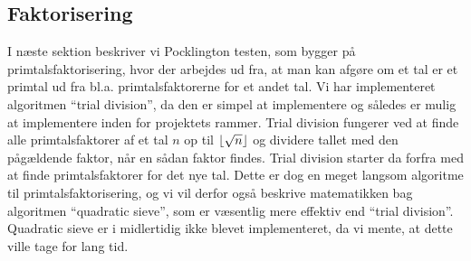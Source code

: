 \subsection{Faktorisering}
I næste sektion beskriver vi Pocklington testen, som bygger på primtalsfaktorisering, hvor
der arbejdes ud fra, at man kan afgøre om et tal er et primtal ud fra bl.a. primtalsfaktorerne
for et andet tal. Vi har implementeret algoritmen ``trial division'', da den er simpel
at implementere og således er mulig at implementere inden for projektets rammer. Trial division
fungerer ved at finde alle primtalsfaktorer af et tal $n$ op til $\lfloor\sqrt{n}\rfloor$ og dividere
tallet med den pågældende faktor, når en sådan faktor findes. Trial division starter da forfra
med at finde primtalsfaktorer for det nye tal.
Dette er dog en meget langsom algoritme til primtalsfaktorisering, og vi vil derfor
også beskrive matematikken bag algoritmen ``quadratic sieve'', som er væsentlig mere effektiv end
``trial division''. Quadratic sieve er i midlertidig ikke blevet implementeret, da
vi mente, at dette ville tage for lang tid.

